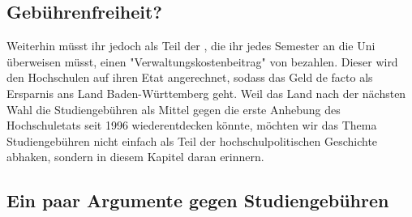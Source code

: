 \subsection*{Gebührenfreiheit?}
Weiterhin müsst ihr jedoch als Teil der \EUR{\beitragssumme}, die ihr jedes
Semester an die Uni überweisen müsst, einen "Verwaltungskostenbeitrag" von
\EUR{\verwaltungsbetrag} bezahlen. Dieser wird den Hochschulen auf ihren Etat
angerechnet, sodass das Geld de facto als Ersparnis ans Land Baden-Württemberg
geht. Weil das Land nach der nächsten Wahl die Studiengebühren als Mittel gegen
die erste Anhebung des Hochschuletats seit 1996 wiederentdecken könnte, möchten
wir das Thema Studiengebühren nicht einfach als Teil der hochschulpolitischen
Geschichte abhaken, sondern in diesem Kapitel daran erinnern.
\iffalse
<<<<<<< HEAD
Wir laden Euch darüberhinaus ein, Euch über die Hintergründe der
Studiengebühren zu informieren, beispielsweise auf unserer Fachschaftshomepage
\footnote{http://mathphys.fsk.uni-heidelberg.de/studgeb-historie.html}.
=======
Wir laden Euch darüberhinaus ein, Euch über die Hintergründe der Studiengebühren zu informieren, beispielsweise auf unserer Fachschaftshomepage \footnote{http://mathphys.fsk.uni-heidelberg.de/studgeb-historie.html}.
>>>>>>> 580f099280de1e977dee5adf32ec741deee93ffe
\fi
%

\subsection*{Ein paar Argumente gegen Studiengebühren}


